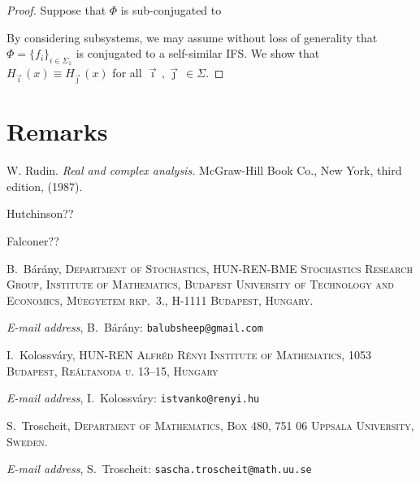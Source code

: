 \documentclass[12pt,]{article}
\makeatletter
\theoremstyle{definition}
\theoremstyle{remark}
\newcommand{\0}{\mathbf{0}}
\newcommand{\bi}{\vec{\imath}\,}
\newcommand{\bj}{\vec{\jmath}\,}
\newcommand{\Addresses}{{%
  \bigskip
  \footnotesize

  B.~B\'ar\'any, \textsc{Department of Stochastics, HUN-REN-BME Stochastics Research Group,
  Institute of Mathematics, Budapest University of Technology and Economics, M\H{u}egyetem rkp.~3.,
H-1111 Budapest, Hungary.}\par\nopagebreak
  \textit{E-mail address}, B.~B\'ar\'any: \texttt{balubsheep@gmail.com}

  \medskip

  I.~Kolossv\'ary, \textsc{HUN-REN Alfréd Rényi Institute of Mathematics, 1053 Budapest, Reáltanoda u.
13–15, Hungary}\par\nopagebreak
  \textit{E-mail address}, I.~Kolossv\'ary: \texttt{istvanko@renyi.hu}
   \medskip


  S.~Troscheit, \textsc{Department of Mathematics, Box 480, 751 06 Uppsala University, Sweden.}\par\nopagebreak
  \textit{E-mail address}, S.~Troscheit: \texttt{sascha.troscheit@math.uu.se}
}}
\makeatother
\begin{document}
\begin{proof}
Suppose that $\Phi$ is sub-conjugated to 

By considering subsystems, we may assume without loss of generality that $\Phi =
  \{f_i\}_{i\in\Sigma_1}$ is conjugated to a self-similar IFS.
  We show that $H_{\bi}(x) \equiv H_{\bj}(x)$ for all $\bi,\bj\in\Sigma$.
  
\end{proof}

\section{Remarks}



\begin{thebibliography}{99}
  W. Rudin.
  \textit{Real and complex analysis.}
  McGraw-Hill Book Co., New York, third edition, (1987).

  Hutchinson??

  Falconer??

\end{thebibliography}

\Addresses
\end{document}
